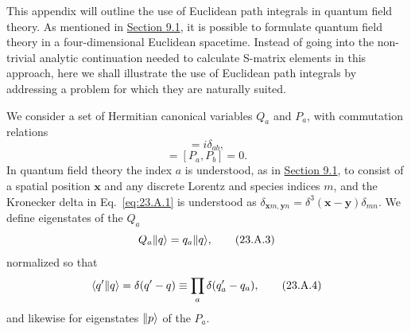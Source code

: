 \label{app:23.A}

This appendix will outline the use of Euclidean path integrals in quantum field theory. As mentioned in \hyperref[sec:9.1]{Section 9.1}, it is possible to formulate quantum field theory in a four-dimensional Euclidean spacetime. Instead of going into the non-trivial analytic continuation needed to calculate S-matrix elements in this approach, here we shall illustrate the use of Euclidean path integrals by addressing a problem for which they are naturally suited.

We consider a set of Hermitian canonical variables $Q_a$ and $P_a$, with commutation relations
\begin{equation}
 [Q_a,P_b]=i\delta_{ab},
 \tag{23.A.1}\label{eq:23.A.1}
\end{equation}
\begin{equation}
 [Q_a,Q_b]=[P_a,P_b]=0.
 \tag{23.A.2}\label{eq:23.A.2}
\end{equation}
In quantum field theory the index $a$ is understood, as in \hyperref[sec:9.1]{Section 9.1}, to consist of a spatial position $\mathbf x$ and any discrete Lorentz and species indices $m$, and the Kronecker delta in Eq.~\eqref{eq:23.A.1} is understood as $\delta_{\mathbf x m,\mathbf y n}=\delta^3(\mathbf x-\mathbf y)\delta_{mn}$. We define eigenstates of the $Q_a$
\begin{equation}
 Q_a\lVert q\rangle=q_a\lVert q\rangle,
 \tag{23.A.3}\label{eq:23.A.3}
\end{equation}
normalized so that
\begin{equation}
 \langle q'\Vert q\rangle=\delta(q'-q)\equiv\prod_a\delta(q'_a-q_a),
 \tag{23.A.4}\label{eq:23.A.4}
\end{equation}
and likewise for eigenstates $\lVert p\rangle$ of the $P_a$.

